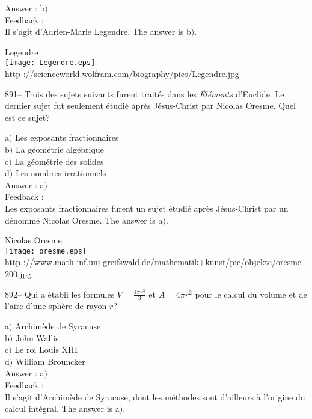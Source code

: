 \documentclass[letterpaper, 12pt]{article}
\begin{document}
Answer : b$)$\\

Feedback : \\
Il s'agit d'Adrien-Marie Legendre. The answer is b$)$.

        \begin{center}
        Legendre\\
    \texttt{[image: Legendre.eps]}\\
        {\footnotesize http
://scienceworld.wolfram.com/biography/pics/Legendre.jpg}
    \end{center}

891-- Trois des sujets suivants furent trait\'es dans les {\sl
\'El\'ements} d'Euclide. Le dernier sujet fut seulement \'etudi\'e
apr\`es J\'esus-Christ par Nicolas Oresme. Quel est ce sujet?

a$)$ Les exposants fractionnaires \\
b$)$ La g\'eom\'etrie alg\'ebrique \\
c$)$ La g\'eom\'etrie des solides \\
d$)$ Les nombres irrationnels\\

Answer : a$)$\\

Feedback : \\
Les exposants fractionnaires furent un sujet \'etudi\'e apr\`es
J\'esus-Christ par un d\'enomm\'e Nicolas Oresme. The answer is a$)$.\\

        \begin{center}
        Nicolas Oresme\\
    \texttt{[image: oresme.eps]}\\
        {\footnotesize http
://www.math-inf.uni-greifswald.de/mathematik+kunst/pic/objekte/oresme-200.jpg}
    \end{center}

892-- Qui a \'etabli les formules $V=\frac{4\pi r^3}3$ et $A=4\pi
r^2$ pour le calcul du volume et de l'aire d'une sph\`ere de rayon
$r$?

a$)$ Archim\`ede de Syracuse \\
b$)$ John Wallis \\
c$)$ Le roi Louis XIII \\
d$)$ William Brouncker\\

Answer : a$)$\\

Feedback : \\
Il s'agit d'Archim\`ede de Syracuse, dont les m\'ethodes sont d'ailleurs \`a
l'origine du calcul int\'egral. The answer is a$)$.\\
\end{document}
